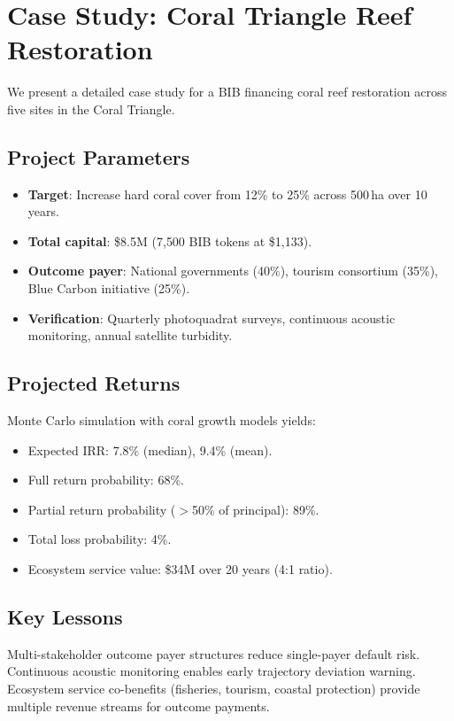 \section{Case Study: Coral Triangle Reef Restoration}

\label{sec:case_study}

We present a detailed case study for a BIB financing coral reef
restoration across five sites in the Coral Triangle.

\subsection{Project Parameters}

\begin{itemize}
  \item \textbf{Target}: Increase hard coral cover from 12\% to 25\%
    across 500\,ha over 10 years.
  \item \textbf{Total capital}: \$8.5M (7{,}500 BIB tokens at \$1{,}133).
  \item \textbf{Outcome payer}: National governments (40\%), tourism
    consortium (35\%), Blue Carbon initiative (25\%).
  \item \textbf{Verification}: Quarterly photoquadrat surveys,
    continuous acoustic monitoring, annual satellite turbidity.
\end{itemize}

\subsection{Projected Returns}

Monte Carlo simulation with coral growth models yields:
\begin{itemize}
  \item Expected IRR: 7.8\% (median), 9.4\% (mean).
  \item Full return probability: 68\%.
  \item Partial return probability ($>$50\% of principal): 89\%.
  \item Total loss probability: 4\%.
  \item Ecosystem service value: \$34M over 20 years (4:1 ratio).
\end{itemize}

\subsection{Key Lessons}

Multi-stakeholder outcome payer structures reduce single-payer default
risk. Continuous acoustic monitoring enables early trajectory deviation
warning. Ecosystem service co-benefits (fisheries, tourism, coastal
protection) provide multiple revenue streams for outcome payments.


